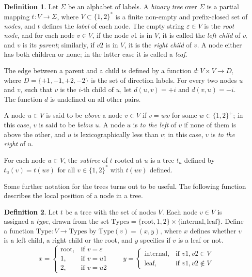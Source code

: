 \documentclass[12pt,a4paper]{article}
\theoremstyle{definition}
\newtheorem{definition}{Definition}
\renewcommand{\epsilon}{\varepsilon}
\begin{document}
\begin{definition}
Let $\Sigma$ be an alphabet of labels.
A \emph{binary tree} over $\Sigma$ is a partial mapping $t \colon V \to \Sigma$,
where $V \subset \{1, 2\}^*$ is a finite non-empty and prefix-closed set of \emph{nodes},
and $t$ defines the \emph{label} of each node.
The empty string $\epsilon \in V$ is the \emph{root node},
and for each node $v \in V$, if the node $v1$ is in $V$,
it is called the \emph{left child} of $v$, and $v$ is its \emph{parent};
similarly, if $v2$ is in $V$,
it is the \emph{right child} of $v$.
A node either has both children or none;
in the latter case it
is called a \emph{leaf}.

The edge between a parent and a child
is defined by a function $d \colon V \times V \to D$,
where $D=\{+1, -1, +2, -2\}$ is the set of direction labels.
For every two nodes $u$ and $v$,
such that $v$ is the $i$-th child of $u$,
let $d(u, v)=+i$ and $d(v, u)=-i$.
The function $d$ is undefined on all other pairs.

A node $u \in V$ is said to be \emph{above} a node $v \in V$ if $v=uw$ for some $w \in \{1, 2\}^+$;
in this case, $v$ is said to be \emph{below} $u$.
A node $u$ is \emph{to the left} of $v$ if none of them is above the other,
and $u$ is lexicographically less than $v$;
in this case, $v$ is \emph{to the right} of $u$.

For each node $u \in V$, the \emph{subtree} of $t$ rooted at $u$
is a tree $t_u$ defined by $t_u(v)=t(uv)$ for all $v \in \{1, 2\}^*$ with $t(uv)$ defined.
\end{definition}

Some further notation for the trees turns out to be useful.
The following function describes the local position of a node in a tree.

\begin{definition}
Let $t$ be a tree with the set of nodes $V$.
Each node $v \in V$ is assigned a \emph{type},
drawn from the set
$\mathrm{Types}=\{\mathrm{root}, 1, 2\} \times \{\mathrm{internal}, \mathrm{leaf}\}$.
Define a function $\mathrm{Type} \colon V \to \mathrm{Types}$
by $\mathrm{Type}(v)=(x, y)$,
where $x$ defines whether $v$ is a left child, a right child or the root,
and $y$ specifies if $v$ is a leaf or not.
\begin{equation*}
	x=\begin{cases}
		\mathrm{root},
			& \text{if } v=\epsilon \\
		1,
			& \text{if } v=u1 \\
		2,
			& \text{if } v=u2
	\end{cases}
	\quad\quad
	y=\begin{cases}
		\mathrm{internal},
			& \text{if } v1, v2 \in V \\
		\mathrm{leaf},
			& \text{if } v1, v2 \notin V
	\end{cases}
\end{equation*}
\end{definition}
\end{document}
